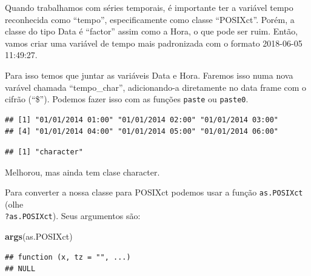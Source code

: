 \documentclass[]{book}
\newenvironment{Shaded}{\begin{snugshade}}{\end{snugshade}}
\newcommand{\KeywordTok}[1]{\textcolor[rgb]{0.13,0.29,0.53}{\textbf{#1}}}
\newcommand{\StringTok}[1]{\textcolor[rgb]{0.31,0.60,0.02}{#1}}
\newcommand{\OperatorTok}[1]{\textcolor[rgb]{0.81,0.36,0.00}{\textbf{#1}}}
\newcommand{\NormalTok}[1]{#1}
\theoremstyle{definition}
\theoremstyle{definition}
\theoremstyle{definition}
\theoremstyle{remark}
\begin{document}
Quando trabalhamos com séries temporais, é importante ter a variável
tempo reconhecida como ``tempo'', especificamente como classe
``POSIXct''. Porém, a classe do tipo Data é ``factor'' assim como a
Hora, o que pode ser ruim. Então, vamos criar uma variável de tempo mais
padronizada com o formato 2018-06-05 11:49:27.

Para isso temos que juntar as variáveis Data e Hora. Faremos isso numa
nova varável chamada ``tempo\_char'', adicionando-a diretamente no data
frame com o cifrão (``\$''). Podemos fazer isso com as funções
\texttt{paste} ou \texttt{paste0}.

\begin{Shaded}
\end{Shaded}

\begin{verbatim}
## [1] "01/01/2014 01:00" "01/01/2014 02:00" "01/01/2014 03:00"
## [4] "01/01/2014 04:00" "01/01/2014 05:00" "01/01/2014 06:00"
\end{verbatim}

\begin{Shaded}
\end{Shaded}

\begin{verbatim}
## [1] "character"
\end{verbatim}

Melhorou, mas ainda tem clase character.

Para converter a nossa classe para POSIXct podemos usar a função
\texttt{as.POSIXct} (olhe\\
\texttt{?as.POSIXct}). Seus argumentos são:

\begin{Shaded}
\begin{Highlighting}[]
\KeywordTok{args}\NormalTok{(as.POSIXct)}
\end{Highlighting}
\end{Shaded}

\begin{verbatim}
## function (x, tz = "", ...) 
## NULL
\end{verbatim}
\end{document}
